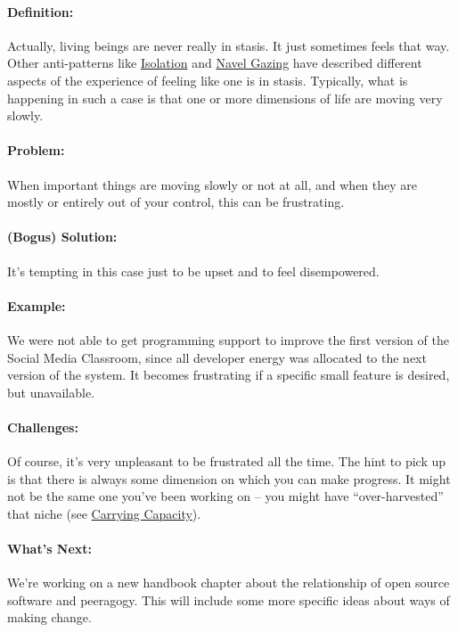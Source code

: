\paragraph{Definition:} Actually, living beings are never really in stasis.
It just sometimes feels that way. Other anti-patterns like
\href{http://peeragogy.org/antipatterns/isolation/}{Isolation} and
\href{http://peeragogy.org/antipatterns/navel-gazing/}{Navel Gazing}
have described different aspects of the experience of feeling like one
is in stasis. Typically, what is happening in such a case is that one or
more dimensions of life are moving very slowly.

\paragraph{Problem:} When important things are moving slowly or not at all,
and when they are mostly or entirely out of your control, this can be
frustrating.

\paragraph{(Bogus) Solution:} It's tempting in this case just to be upset and to
feel disempowered.

\paragraph{Example:} We were not able to get programming support to improve
the first version of the Social Media Classroom, since all developer
energy was allocated to the next version of the system. It becomes
frustrating if a specific small feature is desired, but unavailable.

\paragraph{Challenges:} Of course, it's very unpleasant to be frustrated
all the time. The hint to pick up is that there is always some dimension
on which you can make progress. It might not be the same one you've been
working on -- you might have ``over-harvested'' that niche (see
\href{http://peeragogy.org/patterns-usecases/patterns-and-heuristics/carrying-capacity/}{Carrying
Capacity}).

\paragraph{What's Next:} We're working on a new handbook chapter about the
relationship of open source software and peeragogy. This will include
some more specific ideas about ways of making change.
